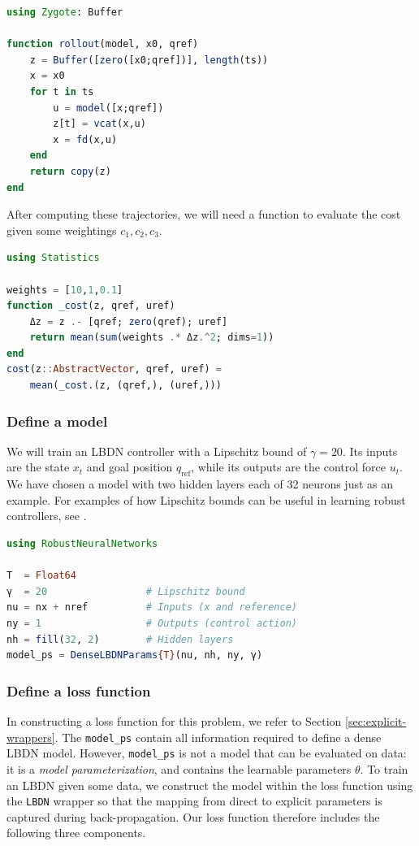 \begin{lstlisting}[language = Julia]
using Zygote: Buffer

function rollout(model, x0, qref)
    z = Buffer([zero([x0;qref])], length(ts))
    x = x0
    for t in ts
        u = model([x;qref])
        z[t] = vcat(x,u)
        x = fd(x,u)
    end
    return copy(z)
end
\end{lstlisting}

After computing these trajectories, we will need a function to evaluate the cost given some weightings $c_1,c_2,c_3$.
\begin{lstlisting}[language = Julia]
using Statistics

weights = [10,1,0.1]
function _cost(z, qref, uref)
    Δz = z .- [qref; zero(qref); uref]
    return mean(sum(weights .* Δz.^2; dims=1))
end
cost(z::AbstractVector, qref, uref) = 
    mean(_cost.(z, (qref,), (uref,)))
\end{lstlisting}

\subsubsection{Define a model} \label{sec:rl-model}

We will train an LBDN controller with a Lipschitz bound of $\gamma = 20$. Its inputs are the state $x_t$ and goal position $q_\mathrm{ref}$, while its outputs are the control force $u_t$. We have chosen a model with two hidden layers each of 32 neurons just as an example. For examples of how Lipschitz bounds can be useful in learning robust controllers, see \cite{Barbara++2023,Russo+Proutiere2021,Song++2023}.

\begin{lstlisting}[language = Julia]
using RobustNeuralNetworks

T  = Float64
γ  = 20                 # Lipschitz bound
nu = nx + nref          # Inputs (x and reference)
ny = 1                  # Outputs (control action)
nh = fill(32, 2)        # Hidden layers
model_ps = DenseLBDNParams{T}(nu, nh, ny, γ)
\end{lstlisting}

\subsubsection{Define a loss function} \label{sec:rl-loss}

In constructing a loss function for this problem, we refer to Section \ref{sec:explicit-wrappers}. The \verb|model_ps| contain all information required to define a dense LBDN model. However, \verb|model_ps| is not a model that can be evaluated on data: it is a \textit{model parameterization}, and contains the learnable parameters $\theta$. To train an LBDN given some data, we construct the model within the loss function using the \verb|LBDN| wrapper so that the mapping from direct to explicit parameters is captured during back-propagation. Our loss function therefore includes the following three components.

